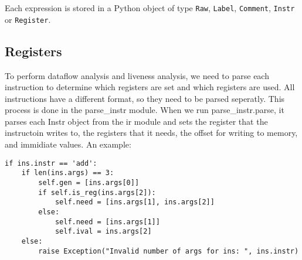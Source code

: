 Each expression is stored in a Python object of type \verb!Raw!, \verb!Label!, \verb!Comment!, \verb!Instr! or \verb!Register!.

\subsection{Registers}
To perform dataflow analysis and liveness analysis, we need to parse each 
instruction to determine which registers are set and which registers are used. 
All instructions have a different format, so they need to be parsed seperatly. 
This process is done in the parse_instr module. When we run parse\_instr.parse,
it parses each Instr object from the ir module and sets the register that the
instructoin writes to, the registers that it needs, the offset for writing to 
memory, and immidiate values. An example:
\begin{lstlisting}
if ins.instr == 'add':  
    if len(ins.args) == 3:
        self.gen = [ins.args[0]]
        if self.is_reg(ins.args[2]):
            self.need = [ins.args[1], ins.args[2]]
        else: 
            self.need = [ins.args[1]]
            self.ival = ins.args[2]
    else:
        raise Exception("Invalid number of args for ins: ", ins.instr)   
\end{lstlisting}
